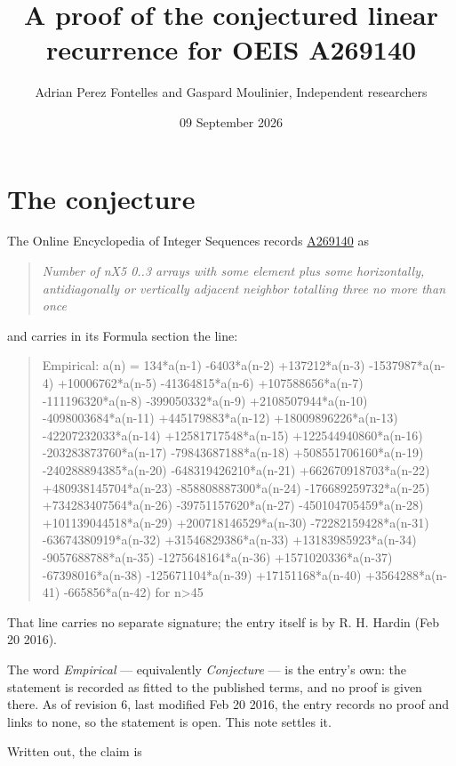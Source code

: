 \documentclass[11pt]{article}
\title{A proof of the conjectured linear recurrence for OEIS A269140}
\author{Adrian Perez Fontelles and Gaspard Moulinier, Independent researchers}
\date{09 September 2026}
\theoremstyle{definition}
\begin{document}
\maketitle
\section{The conjecture}

The Online Encyclopedia of Integer Sequences records \href{https://oeis.org/A269140}{A269140} as

\begin{quote}\itshape Number of nX5 0..3 arrays with some element plus some horizontally, antidiagonally or vertically adjacent neighbor totalling three no more than once\end{quote}

and carries in its Formula section the line:

\begin{quote}\ttfamily Empirical: a(n) = 134*a(n-1) -6403*a(n-2) +137212*a(n-3) -1537987*a(n-4) +10006762*a(n-5) -41364815*a(n-6) +107588656*a(n-7) -111196320*a(n-8) -399050332*a(n-9) +2108507944*a(n-10) -4098003684*a(n-11) +445179883*a(n-12) +18009896226*a(n-13) -42207232033*a(n-14) +12581717548*a(n-15) +122544940860*a(n-16) -203283873760*a(n-17) -79843687188*a(n-18) +508551706160*a(n-19) -240288894385*a(n-20) -648319426210*a(n-21) +662670918703*a(n-22) +480938145704*a(n-23) -858808887300*a(n-24) -176689259732*a(n-25) +734283407564*a(n-26) -39751157620*a(n-27) -450104705459*a(n-28) +101139044518*a(n-29) +200718146529*a(n-30) -72282159428*a(n-31) -63674380919*a(n-32) +31546829386*a(n-33) +13183985923*a(n-34) -9057688788*a(n-35) -1275648164*a(n-36) +1571020336*a(n-37) -67398016*a(n-38) -125671104*a(n-39) +17151168*a(n-40) +3564288*a(n-41) -665856*a(n-42) for n>45\end{quote}

That line carries no separate signature; the entry itself is by R. H. Hardin (Feb 20 2016).

The word {\itshape Empirical} --- equivalently {\itshape Conjecture} --- is the entry's own: the statement is recorded as fitted to the published terms, and no proof is given there. As of revision 6, last modified Feb 20 2016, the entry records no proof and links to none, so the statement is open. This note settles it.

Written out, the claim is
\end{document}
